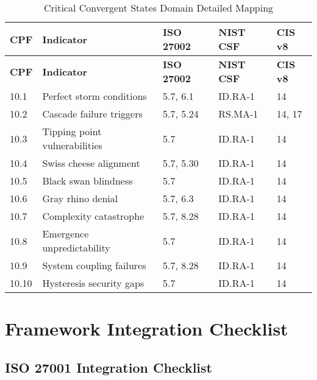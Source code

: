 \documentclass[11pt,a4paper]{article}
\begin{document}
\begin{longtable}{p{1cm}p{4cm}p{2.5cm}p{2.5cm}p{2cm}}
\caption{Critical Convergent States Domain Detailed Mapping} \\
\toprule
\textbf{CPF} & \textbf{Indicator} & \textbf{ISO 27002} & \textbf{NIST CSF} & \textbf{CIS v8} \\
\midrule
\endfirsthead
\toprule
\textbf{CPF} & \textbf{Indicator} & \textbf{ISO 27002} & \textbf{NIST CSF} & \textbf{CIS v8} \\
\midrule
\endhead
\bottomrule
\endlastfoot

10.1 & Perfect storm conditions & 5.7, 6.1 & ID.RA-1 & 14 \\
10.2 & Cascade failure triggers & 5.7, 5.24 & RS.MA-1 & 14, 17 \\
10.3 & Tipping point vulnerabilities & 5.7 & ID.RA-1 & 14 \\
10.4 & Swiss cheese alignment & 5.7, 5.30 & ID.RA-1 & 14 \\
10.5 & Black swan blindness & 5.7 & ID.RA-1 & 14 \\
10.6 & Gray rhino denial & 5.7, 6.3 & ID.RA-1 & 14 \\
10.7 & Complexity catastrophe & 5.7, 8.28 & ID.RA-1 & 14 \\
10.8 & Emergence unpredictability & 5.7 & ID.RA-1 & 14 \\
10.9 & System coupling failures & 5.7, 8.28 & ID.RA-1 & 14 \\
10.10 & Hysteresis security gaps & 5.7 & ID.RA-1 & 14 \\

\end{longtable}

\section{Framework Integration Checklist}

\subsection{ISO 27001 Integration Checklist}
\end{document}
